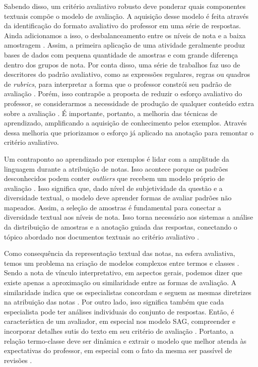 Sabendo disso, um critério avaliativo robusto deve ponderar quais componentes textuais compõe o modelo de avaliação. A aquisição desse modelo é feita através da identificação do formato avaliativo do professor em uma série de respostas. Ainda adicionamos a isso, o desbalanceamento entre os níveis de nota e a baixa amostragem \cite{dzikovska2012, lui2022}. Assim, a primeira aplicação de uma atividade geralmente produz bases de dados com pequena quantidade de amostras e com grande diferença dentro dos grupos de nota. Por conta disso, uma série de trabalhos faz uso de descritores do padrão avaliativo, como as expressões regulares, regras ou quadros de \textit{rubrics}, para interpretar a forma que o professor constrói seu padrão de avaliação \cite{butcher2010, mohler2011, ramachandran2015a, condor2021}. Porém, isso contrapõe a proposta de reduzir o esforço avaliativo do professor, se considerarmos a necessidade de produção de qualquer conteúdo extra sobre a avaliação \cite{zesch2015, horbach2018}. É importante, portanto, a melhoria das técnicas de aprendizado, amplificando a aquisição de conhecimento pelos exemplos. Através dessa melhoria que priorizamos o esforço já aplicado na anotação para remontar o critério avaliativo.

Um contraponto ao aprendizado por exemplos é lidar com a amplitude da linguagem durante a atribuição de notas. Isso acontece porque os padrões desconhecidos podem conter \textit{outliers} que recebem um modelo próprio de avaliação \cite{filighera2020}. Isso significa que, dado nível de subjetividade da questão e a diversidade textual, o modelo deve aprender formas de avaliar padrões não mapeados. Assim, a seleção de amostras é fundamental para conectar a diversidade textual aos níveis de nota. Isso torna necessário aos sistemas a análise da distribuição de amostras e a anotação guiada das respostas, conectando o tópico abordado nos documentos textuais ao critério avaliativo \cite{marvaniya2018}.

Como consequência da representação textual das notas, na esfera avaliativa, temos um problema na criação de modelos complexos entre termos e classes \cite{ramachandran2015a}. Sendo a nota de vínculo interpretativo, em aspectos gerais, podemos dizer que existe apenas a aproximação ou similaridade entre as formas de avaliação. A similaridade indica que os especialistas concordam e seguem as mesmas diretrizes na atribuição das notas \cite{artstein2008}. Por outro lado, isso significa também que cada especialista pode ter análises individuais do conjunto de respostas. Então, é característica de um avaliador, em especial nos modelo SAG, compreender e incorporar detalhes sutis do texto em seu critério de avaliação \cite{horbach2018, condor2021}. Portanto, a relação termo-classe deve ser dinâmica e extrair o modelo que melhor atenda às expectativas do professor, em especial com o fato da mesma ser passível de revisões \cite{spalenza2016a}.

